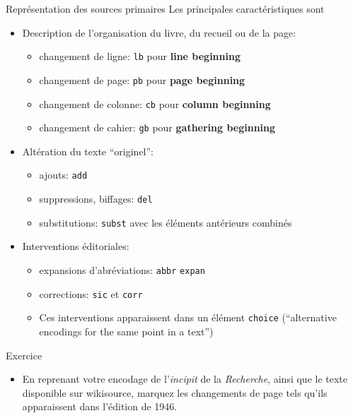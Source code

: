 \documentclass[11pt,aspectratio=1610]{beamer}
\begin{document}
\begin{frame}{Représentation des sources primaires}
Les principales caractéristiques sont
\begin{itemize}
\item Description de l'organisation du livre, du recueil ou de la page:
\begin{itemize}
\item changement de ligne: \texttt{lb} pour \textbf{line beginning}
\item changement de page: \texttt{pb} pour \textbf{page beginning}
\item changement de colonne: \texttt{cb} pour \textbf{column beginning}
\item changement de cahier: \texttt{gb} pour \textbf{gathering beginning}
\end{itemize}
\item Altération du texte \enquote{originel}:
\begin{itemize}
\item ajouts: \texttt{add}
\item suppressions, biffages: \texttt{del}
\item substitutions: \texttt{subst} avec les éléments antérieurs combinés
\end{itemize}
\item Interventions éditoriales:
\begin{itemize}
\item expansions d'abréviations: \texttt{abbr} \texttt{expan}
\item corrections: \texttt{sic} et \texttt{corr}
\item Ces interventions apparaissent dans un élément \texttt{choice} (\enquote{alternative encodings for the same point in a text})
\end{itemize}
\end{itemize}
\end{frame}


\begin{frame}{Exercice}
\begin{itemize}
\item En reprenant votre encodage de l'\textit{incipit} de la \textit{Recherche}, ainsi que le texte disponible sur wikisource, marquez les changements de page tels qu'ils apparaissent dans l'édition de 1946.
\end{itemize}
\end{frame}
\end{document}
